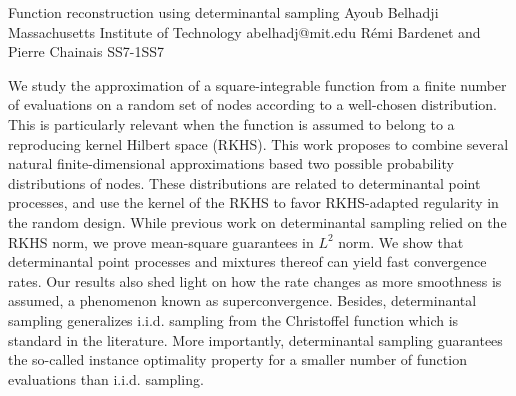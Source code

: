 \begin{talk}
  {Function reconstruction using determinantal sampling}%
  {Ayoub Belhadji}%
  {Massachusetts Institute of Technology}%
  {abelhadj@mit.edu}%
  {Rémi Bardenet and Pierre Chainais}%
{}{}{SS7-1}{SS7}

			
We study the approximation of a square-integrable function from a finite number of evaluations on a random set of nodes according to a well-chosen distribution. This is particularly relevant when the function is assumed to belong to a reproducing kernel Hilbert space (RKHS). This work proposes to combine several natural finite-dimensional approximations based two possible probability distributions of nodes. These distributions are related to determinantal point processes, and use the kernel of the RKHS to favor RKHS-adapted regularity in the random design. While previous work on determinantal sampling relied on the RKHS norm, we prove mean-square guarantees in $L^2$ norm. We show that determinantal point processes and mixtures thereof can yield fast convergence rates. Our results also shed light on how the rate changes as more smoothness is assumed, a phenomenon known as superconvergence. Besides, determinantal sampling generalizes i.i.d. sampling from the Christoffel function which is standard in the literature. More importantly, determinantal sampling guarantees the so-called instance optimality property for a smaller number of function evaluations than i.i.d. sampling.

\medskip


\end{talk}


